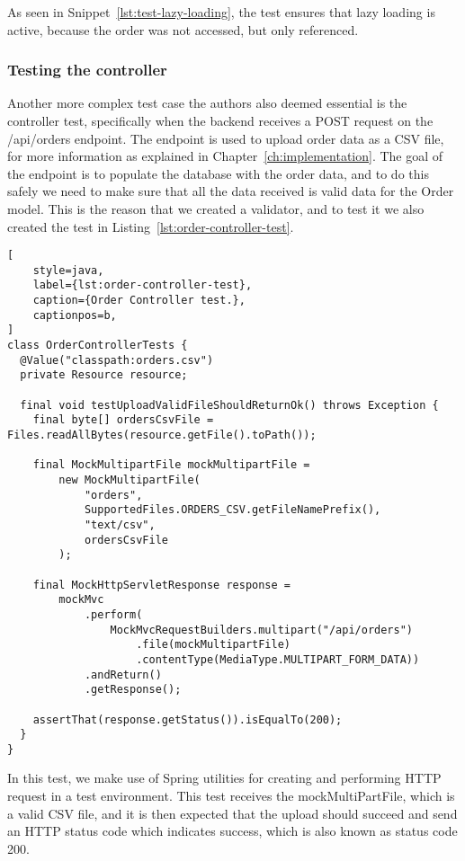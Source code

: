 As seen in Snippet~\ref{lst:test-lazy-loading}, the test ensures that lazy loading is active, because the order was not
accessed, but only referenced.

\subsubsection{Testing the controller}\label{subsubsec:controller-unit-test}
Another more complex test case the authors also deemed essential is the controller test, specifically when
the backend receives a POST request on the /api/orders endpoint.
The endpoint is used to upload order data as a CSV file, for more information as explained in
Chapter~\ref{ch:implementation}.
The goal of the endpoint is to populate the database with the order data, and to do this safely we need
to make sure that all the data received is valid data for the Order model.
This is the reason that we created a validator, and to test it we also created the test in
Listing~\ref{lst:order-controller-test}.

\begin{lstlisting}[
    style=java,
    label={lst:order-controller-test},
    caption={Order Controller test.},
    captionpos=b,
]
class OrderControllerTests {
  @Value("classpath:orders.csv")
  private Resource resource;

  final void testUploadValidFileShouldReturnOk() throws Exception {
    final byte[] ordersCsvFile = Files.readAllBytes(resource.getFile().toPath());

    final MockMultipartFile mockMultipartFile =
        new MockMultipartFile(
            "orders",
            SupportedFiles.ORDERS_CSV.getFileNamePrefix(),
            "text/csv",
            ordersCsvFile
        );

    final MockHttpServletResponse response =
        mockMvc
            .perform(
                MockMvcRequestBuilders.multipart("/api/orders")
                    .file(mockMultipartFile)
                    .contentType(MediaType.MULTIPART_FORM_DATA))
            .andReturn()
            .getResponse();

    assertThat(response.getStatus()).isEqualTo(200);
  }
}
\end{lstlisting}

In this test, we make use of Spring utilities for creating and performing HTTP request in a test
environment.
This test receives the mockMultiPartFile, which is a valid CSV file, and it is then expected that the
upload should succeed and send an HTTP status code which indicates success,
which is also known as status code 200.
